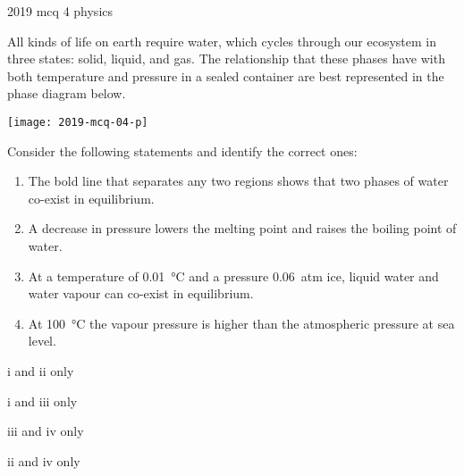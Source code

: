 \ylDisplay
{}%
{2019}%
{mcq}%
{4}%
{physics}%
{}%
{
\ifStatement
All kinds of life on earth require water, which cycles through our ecosystem in three states:  solid, liquid, and gas. The relationship that these phases have with both temperature and  pressure in a sealed container are best represented in the phase diagram below.
\begin{center}
  \texttt{[image: 2019-mcq-04-p]}
\end{center}
Consider the following statements and identify the correct ones:
\begin{enumerate}
  \item The bold line that separates any two regions shows that two phases of water co-exist in equilibrium.
  \item A decrease in pressure lowers the melting point and raises the boiling point of water.
  \item At a temperature of \SI{0.01}{\degreeCelsius} and a pressure \SI{0.06}{atm} ice, liquid water and water vapour  can co-exist in equilibrium.
  \item At \SI{100}{\degreeCelsius} the vapour pressure is higher than the atmospheric pressure at sea level.
\end{enumerate}
\fi


i and ii only
\fi


i and iii only
\fi


iii and iv only
\fi


ii and iv only
\fi


\ifHint

\fi


\ifSolution

\fi


\ifEstStatement

\fi



\fi



\fi



\fi



\fi


\ifEstHint

\fi


\ifEstSolution

\fi
}
